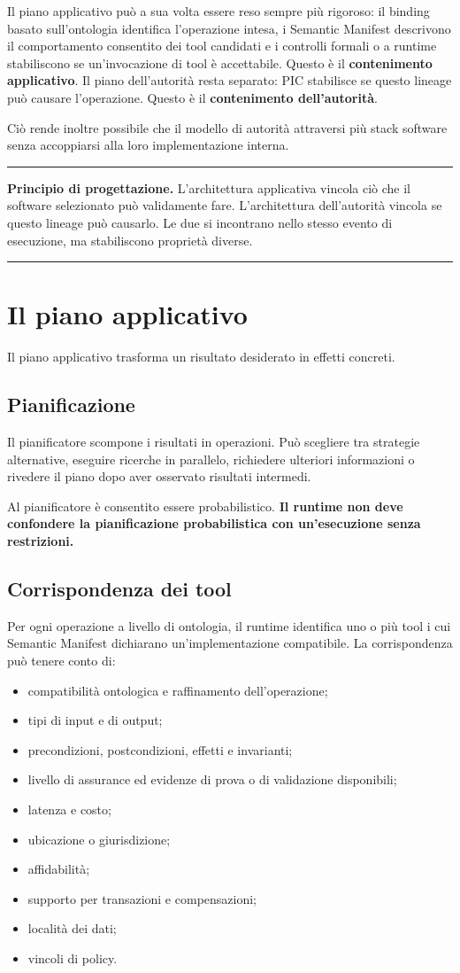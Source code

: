 \documentclass[10pt,oneside,openany]{book}
\newcommand{\term}[1]{\textbf{#1}}
\newcommand{\principle}[1]{%
  \vspace{4pt}
  \noindent\begin{minipage}{\linewidth}
  \hrule\vspace{5pt}
  \small\sffamily\raggedright\textbf{Principio di progettazione.} #1
  \vspace{5pt}\hrule
  \end{minipage}\vspace{4pt}
}
\begin{document}
Il piano applicativo può a sua volta essere reso sempre più rigoroso: il binding basato sull'ontologia identifica l'operazione intesa, i Semantic Manifest descrivono il comportamento consentito dei tool candidati e i controlli formali o a runtime stabiliscono se un'invocazione di tool è accettabile. Questo è il \term{contenimento applicativo}. Il piano dell'autorità resta separato: PIC stabilisce se questo lineage può causare l'operazione. Questo è il \term{contenimento dell'autorità}.

Ciò rende inoltre possibile che il modello di autorità attraversi più stack software senza accoppiarsi alla loro implementazione interna.

\principle{L'architettura applicativa vincola ciò che il software selezionato può validamente fare. L'architettura dell'autorità vincola se questo lineage può causarlo. Le due si incontrano nello stesso evento di esecuzione, ma stabiliscono proprietà diverse.}

\chapter{Il piano applicativo}

Il piano applicativo trasforma un risultato desiderato in effetti concreti.

\section{Pianificazione}
Il pianificatore scompone i risultati in operazioni. Può scegliere tra strategie alternative, eseguire ricerche in parallelo, richiedere ulteriori informazioni o rivedere il piano dopo aver osservato risultati intermedi.

Al pianificatore è consentito essere probabilistico. \textbf{Il runtime non deve confondere la pianificazione probabilistica con un'esecuzione senza restrizioni.}

\section{Corrispondenza dei tool}
Per ogni operazione a livello di ontologia, il runtime identifica uno o più tool i cui Semantic Manifest dichiarano un'implementazione compatibile. La corrispondenza può tenere conto di:

\begin{itemize}
\item compatibilità ontologica e raffinamento dell'operazione;
\item tipi di input e di output;
\item precondizioni, postcondizioni, effetti e invarianti;
\item livello di assurance ed evidenze di prova o di validazione disponibili;
\item latenza e costo;
\item ubicazione o giurisdizione;
\item affidabilità;
\item supporto per transazioni e compensazioni;
\item località dei dati;
\item vincoli di policy.
\end{itemize}
\end{document}
